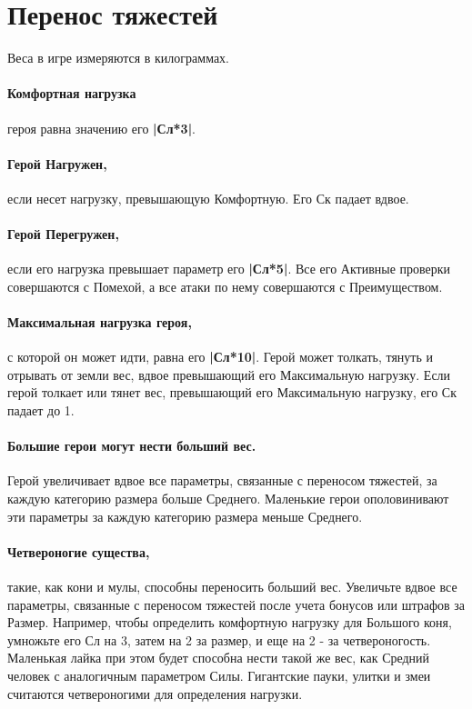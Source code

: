 \section{Перенос тяжестей}
Веса в игре измеряются в килограммах.
\paragraph{Комфортная нагрузка} героя равна значению его \textbf{|Сл*3|}. 
\paragraph{Герой Нагружен,} если несет нагрузку, превышающую Комфортную. Его Ск падает вдвое. 
\paragraph{Герой Перегружен,} если его нагрузка превышает параметр его \textbf{|Сл*5|}. Все его Активные проверки совершаются с Помехой, а все атаки по нему совершаются с Преимуществом. 
\paragraph{Максимальная нагрузка героя,} с которой он может идти, равна его \textbf{|Сл*10|}.
\newline Герой может толкать, тянуть и отрывать от земли вес, вдвое превышающий его Максимальную нагрузку. Если герой толкает или тянет вес, превышающий его Максимальную нагрузку, его Ск падает до 1. 
\paragraph{Большие герои могут нести больший вес.} Герой увеличивает вдвое все параметры, связанные с переносом тяжестей, за каждую категорию размера больше Среднего. Маленькие герои ополовинивают эти параметры за каждую категорию размера меньше Среднего.
\paragraph{Четвероногие существа,} такие, как кони и мулы, способны переносить больший вес. Увеличьте вдвое все параметры, связанные с переносом тяжестей после учета бонусов или штрафов за Размер. 
\newline Например, чтобы определить комфортную нагрузку для Большого коня, умножьте его Сл на 3, затем на 2 за размер, и еще на 2 - за четвероногость. Маленькая лайка при этом будет способна нести такой же вес, как Средний человек с аналогичным параметром Силы. Гигантские пауки, улитки и змеи считаются четвероногими для определения нагрузки.

